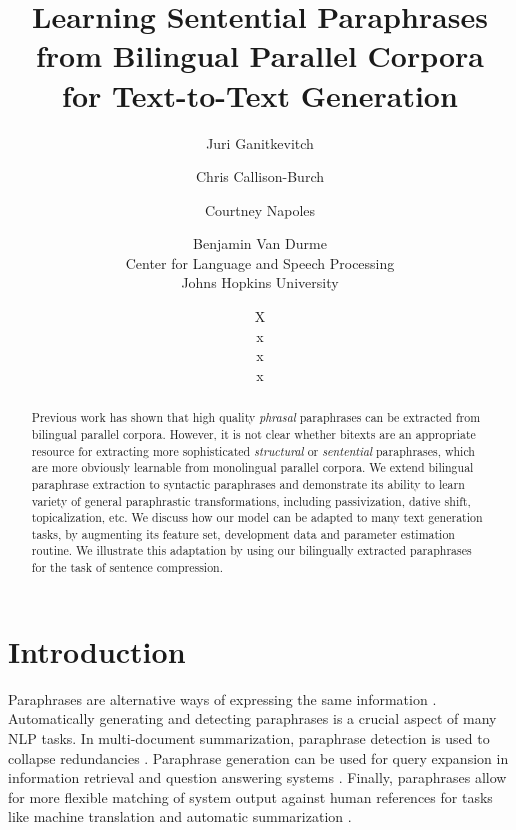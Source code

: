 \documentclass[11pt]{article}
\title{Learning Sentential Paraphrases from Bilingual Parallel Corpora \\ for Text-to-Text Generation}
\author{Juri Ganitkevitch \and Chris Callison-Burch \and Courtney
  Napoles \and Benjamin Van Durme\\ 
Center for Language and Speech Processing\\ 
Johns Hopkins University}
\author{X\\ 
x\\ 
x\\ 
x}
\date{}
\begin{document}
\maketitle

\begin{abstract}
Previous work has shown that high quality {\it phrasal} paraphrases can be extracted from  bilingual parallel corpora.  However, it is not clear whether bitexts are an appropriate resource for extracting more sophisticated {\it structural} or {\it sentential} paraphrases, which are more obviously learnable from monolingual parallel corpora.
We extend bilingual paraphrase extraction to syntactic paraphrases
and demonstrate its ability to learn variety of general paraphrastic transformations, 
including passivization, dative shift, topicalization, etc.  We discuss how our model can be adapted to many text generation tasks, by augmenting its feature set, development data and parameter estimation routine.  We illustrate this adaptation by using our bilingually extracted paraphrases for the task of sentence compression. 
\end{abstract}


\section{Introduction} \label{introduction}

Paraphrases are alternative ways of expressing the same information \cite{Culicover1968}. 
Automatically generating and detecting paraphrases is a crucial aspect of many 
NLP tasks.
In multi-document summarization, paraphrase detection is used
to collapse redundancies \cite{Barzilay1999,BarzilayThesis}. Paraphrase generation can be used 
for query expansion in information retrieval and question
answering systems \cite{mckeown:1979:ACL,Anick1999,Ravichandran2002,Riezler2007}. 
Finally, paraphrases allow for more flexible matching of system output against human references for tasks like machine translation and automatic summarization \cite{Zhou2006b,Kauchak2006,Owczarzak2006,Madnani2007,Snover2010}. 
\end{document}
